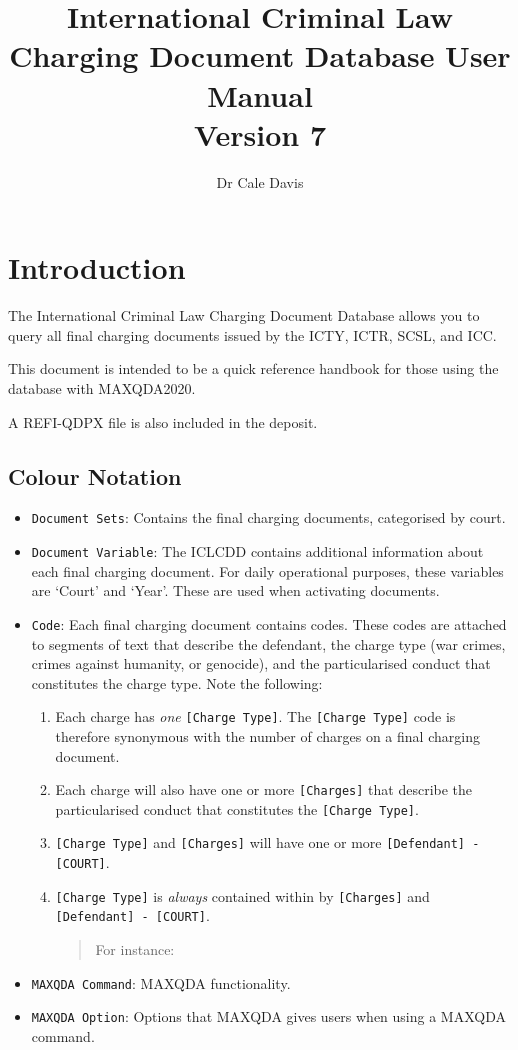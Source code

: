 \documentclass[usenames,dvipsnames]{article}
\title{International Criminal Law Charging Document Database User Manual \\ Version 7}
\author{Dr Cale Davis}
\newcommand{\code}[1]{\colorbox{light-gray}{\texttt{#1}}}
\newcommand{\command}[1]{\colorbox{light-red}{\texttt{#1}}}
\newcommand{\option}[1]{\colorbox{light-blue}{\texttt{#1}}}
\newcommand{\chargingdocs}[1]{\colorbox{light-yellow}{\texttt{#1}}}
\newcommand{\variable}[1]{\colorbox{light-green}{\texttt{#1}}}
\begin{document}
	\maketitle

\section{Introduction}
The International Criminal Law Charging Document Database allows you to query all final charging documents issued by the ICTY, ICTR, SCSL, and ICC.

This document is intended to be a quick reference handbook for those using the database with MAXQDA2020.

A REFI-QDPX file is also included in the deposit.
\subsection{Colour Notation}
\begin{itemize}
	\item \chargingdocs{Document Sets}: Contains the final charging documents, categorised by court.
	\item \variable{Document Variable}: The ICLCDD contains additional information about each final charging document. For daily operational purposes, these variables are `Court' and `Year'. These are used when activating documents.
	\item \code{Code}: Each final charging document contains codes. These codes are attached to segments of text that describe the defendant, the charge type (war crimes, crimes against humanity, or genocide), and the particularised conduct that constitutes the charge type. Note the following:
	\begin{enumerate}
		\item Each charge has \textit{one} \code{[Charge Type]}. The \code{[Charge Type]} code is therefore synonymous with the number of charges on a final charging document.
		\item Each charge will also have one or more \code{[Charges]} that describe the particularised conduct that constitutes the \code{[Charge Type]}.
		\item \code{[Charge Type]} and \code{[Charges]} will have one or more \code{[Defendant] - [COURT]}.
		\item \code{[Charge Type]} is \textit{always} contained within by \code{[Charges]} and \code{[Defendant] - [COURT]}.
		\begin{quote}
		For instance: 
	\end{quote}
	\end{enumerate}
	\item \command{MAXQDA Command}: MAXQDA functionality.
	\item \option{MAXQDA Option}: Options that MAXQDA gives users when using a MAXQDA command.
\end{itemize} 
\end{document}
